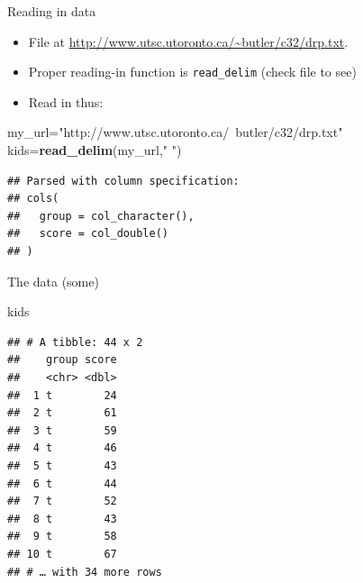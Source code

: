 \documentclass[
  ignorenonframetext,
]{beamer}
\newenvironment{Shaded}{\begin{snugshade}}{\end{snugshade}}
\newcommand{\KeywordTok}[1]{\textcolor[rgb]{0.13,0.29,0.53}{\textbf{#1}}}
\newcommand{\NormalTok}[1]{#1}
\newcommand{\StringTok}[1]{\textcolor[rgb]{0.31,0.60,0.02}{#1}}
\providecommand{\tightlist}{%
  \setlength{\itemsep}{0pt}\setlength{\parskip}{0pt}}
\begin{document}
\begin{frame}[fragile]{Reading in data}
\protect\hypertarget{reading-in-data-1}{}

\begin{itemize}
\tightlist
\item
  File at \url{http://www.utsc.utoronto.ca/~butler/c32/drp.txt}.
\item
  Proper reading-in function is \texttt{read\_delim} (check file to see)
\item
  Read in thus:
\end{itemize}

\begin{Shaded}
\begin{Highlighting}[]
\NormalTok{my_url=}\StringTok{"http://www.utsc.utoronto.ca/~butler/c32/drp.txt"}
\NormalTok{kids=}\KeywordTok{read_delim}\NormalTok{(my_url,}\StringTok{" "}\NormalTok{)}
\end{Highlighting}
\end{Shaded}

\begin{verbatim}
## Parsed with column specification:
## cols(
##   group = col_character(),
##   score = col_double()
## )
\end{verbatim}

\end{frame}

\begin{frame}[fragile]{The data (some)}
\protect\hypertarget{the-data-some-1}{}

\begin{Shaded}
\begin{Highlighting}[]
\NormalTok{kids}
\end{Highlighting}
\end{Shaded}

\begin{verbatim}
## # A tibble: 44 x 2
##    group score
##    <chr> <dbl>
##  1 t        24
##  2 t        61
##  3 t        59
##  4 t        46
##  5 t        43
##  6 t        44
##  7 t        52
##  8 t        43
##  9 t        58
## 10 t        67
## # … with 34 more rows
\end{verbatim}

\end{frame}
\end{document}
